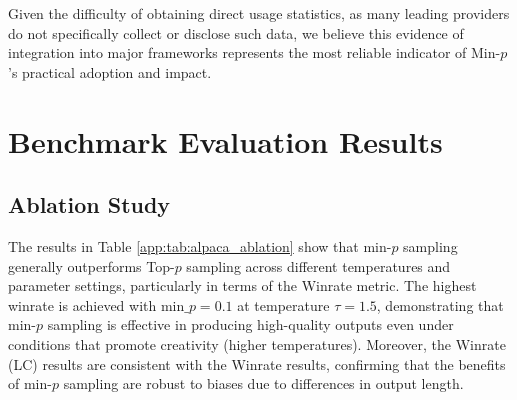 \documentclass{article}
\begin{document}
Given the difficulty of obtaining direct usage statistics, as many leading providers do not specifically collect or disclose such data, we believe this evidence of integration into major frameworks represents the most reliable indicator of Min-\( p \)'s practical adoption and impact.


\section{Benchmark Evaluation Results}

\subsection{Ablation Study}

The results in Table \ref{app:tab:alpaca_ablation} show that min-\( p \) sampling generally outperforms Top-\(p\) sampling across different temperatures and parameter settings, particularly in terms of the Winrate metric. The highest winrate is achieved with \(\text{min\_}p = 0.1\) at temperature \(\tau = 1.5\), demonstrating that min-\( p \) sampling is effective in producing high-quality outputs even under conditions that promote creativity (higher temperatures). Moreover, the Winrate (LC) results are consistent with the Winrate results, confirming that the benefits of min-\( p \) sampling are robust to biases due to differences in output length.
\end{document}
